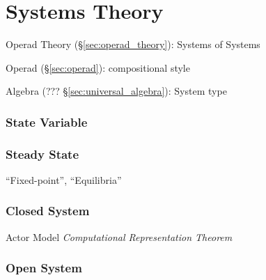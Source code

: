 \part{Systems Theory}\label{sec:systems_theory}


Operad Theory (\S\ref{sec:operad_theory}): Systems of Systems

Operad (\S\ref{sec:operad}): compositional style

Algebra (??? \S\ref{sec:universal_algebra}): System type



\section{State Variable}\label{sec:state_variable}

\section{Steady State}\label{sec:steady_state}

``Fixed-point'', ``Equilibria'' %



\section{Closed System}\label{sec:closed_system}


Actor Model \emph{Computational Representation Theorem}



\section{Open System}\label{sec:open_system}

